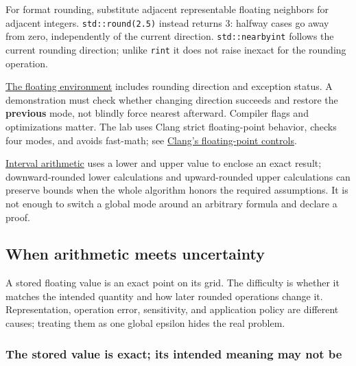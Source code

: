For format rounding, substitute adjacent representable floating neighbors for adjacent integers. \texttt{std::round(2.5)} instead returns 3: halfway cases go away from zero, independently of the current direction. \texttt{std::nearbyint} follows the current rounding direction; unlike \texttt{rint} it does not raise inexact for the rounding operation.

\hyperref[appendix-f11d1a521253]{The floating environment} includes rounding direction and exception status. A demonstration must check whether changing direction succeeds and restore the \textbf{previous} mode, not blindly force nearest afterward. Compiler flags and optimizations matter. The lab uses Clang strict floating-point behavior, checks four modes, and avoids fast-math; see \href{https://clang.llvm.org/docs/UsersManual.html\#controlling-floating-point-behavior}{Clang's floating-point controls}.

\hyperref[appendix-1823a14330cb]{Interval arithmetic} uses a lower and upper value to enclose an exact result; downward-rounded lower calculations and upward-rounded upper calculations can preserve bounds when the whole algorithm honors the required assumptions. It is not enough to switch a global mode around an arbitrary formula and declare a proof.

\subsection{When arithmetic meets uncertainty}\label{01-foundations-i-ch001-when-arithmetic-meets-uncertainty}

\hypertarget{01-foundations-i-ch001-when-arithmetic-meets-uncertainty}{}

A stored floating value is an exact point on its grid. The difficulty is whether it matches the intended quantity and how later rounded operations change it. Representation, operation error, sensitivity, and application policy are different causes; treating them as one global epsilon hides the real problem.

\subsubsection{The stored value is exact; its intended meaning may not be}\label{01-foundations-i-ch001-the-stored-value-is-exact-its-intended-meaning-may-not-be}

\hypertarget{01-foundations-i-ch001-the-stored-value-is-exact-its-intended-meaning-may-not-be}{}

